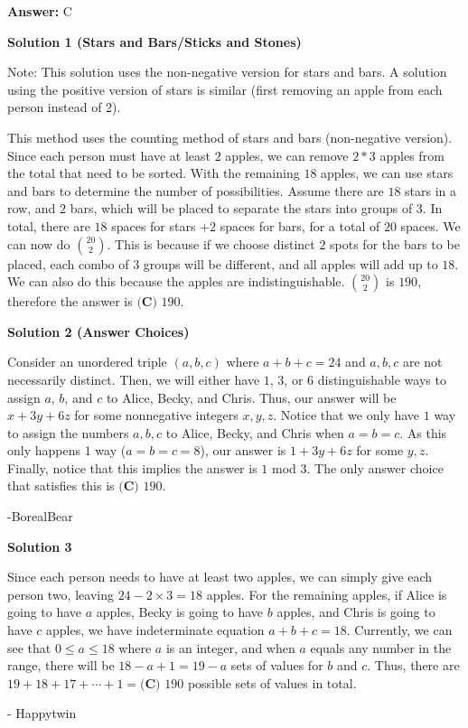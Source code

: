 \begin{enumerate}
 \textbf{Answer: }C



\textbf{Solution 1 (Stars and Bars/Sticks and Stones)}

Note: This solution uses the non-negative version for stars and bars. A solution using the positive version of stars is similar (first removing an apple from each person instead of 2).

 This method uses the counting method of stars and bars (non-negative version). Since each person must have at least $2$ apples, we can remove $2*3$ apples from the total that need to be sorted. With the remaining $18$ apples, we can use stars and bars to determine the number of possibilities. Assume there are $18$ stars in a row, and $2$ bars, which will be placed to separate the stars into groups of $3$. In total, there are $18$ spaces for stars $+ 2$ spaces for bars, for a total of $20$ spaces. We can now do $20 \choose 2$. This is because if we choose distinct $2$ spots for the bars to be placed, each combo of $3$ groups will be different, and all apples will add up to $18$. We can also do this because the apples are indistinguishable. $20 \choose 2$ is $190$, therefore the answer is $\boxed{\textbf{(C) }190}$.

 



\textbf{Solution 2 (Answer Choices)}

Consider an unordered triple $(a,b,c)$ where $a+b+c=24$ and $a,b,c$ are not necessarily distinct. Then, we will either have $1$, $3$, or $6$ distinguishable ways to assign $a$, $b$, and $c$ to Alice, Becky, and Chris. Thus, our answer will be $x+3y+6z$ for some nonnegative integers $x,y,z$. Notice that we only have $1$ way to assign the numbers $a,b,c$ to Alice, Becky, and Chris when $a=b=c$. As this only happens $1$ way ($a=b=c=8$), our answer is $1+3y+6z$ for some $y,z$. Finally, notice that this implies the answer is $1$ mod $3$. The only answer choice that satisfies this is $\boxed{\textbf{(C) }190}$. 

 -BorealBear

 



\textbf{Solution 3}

Since each person needs to have at least two apples, we can simply give each person two, leaving $24 - 2\times3=18$ apples. For the remaining apples, if Alice is going to have $a$ apples, Becky is going to have $b$ apples, and Chris is going to have $c$ apples, we have indeterminate equation $a+b+c=18$. Currently, we can see that $0 \leq a\leq 18$ where $a$ is an integer, and when $a$ equals any number in the range, there will be $18-a+1=19-a$ sets of values for $b$ and $c$. Thus, there are $19 + 18 + 17 + \cdots + 1 = \boxed{\textbf{(C) }190}$ possible sets of values in total.

 - Happytwin

 


\end{enumerate}